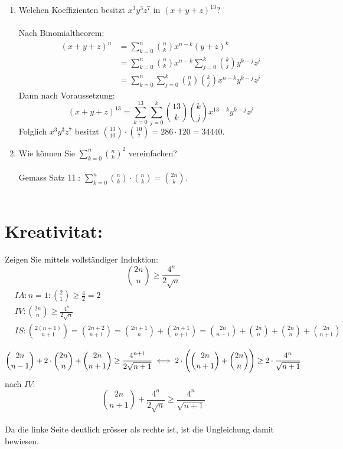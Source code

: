 \begin{enumerate}[label=(\alph*)]
        \item Welchen Koeffizienten besitzt $x^3y^3z^7$ in $(x+y+z)^{13}$?\\\\
        Nach Binomialtheorem:
        \begin{align*}
        (x+y+z)^{n} &= \sum_{k=0}^{n} \binom{n}{k}x^{n-k}(y+z)^k \\
        &= \sum_{k=0}^{n} \binom{n}{k}x^{n-k}\sum_{j=0}^{k}\binom{k}{j}y^{k-j}z^j \\
        &= \sum_{k=0}^{n}\sum_{j=0}^{k} \binom{n}{k}\binom{k}{j}x^{n-k}y^{k-j}z^j
        \end{align*}
        Dann nach Voraussetzung: 
        \[(x+y+z)^{13} = \sum_{k=0}^{13}\sum_{j=0}^{k} \binom{13}{k}\binom{k}{j}x^{13-k}y^{k-j}z^j\]
        Folglich $x^3y^3z^7$ besitzt $\binom{13}{10}\cdot\binom{10}{7} = 286 \cdot 120 = 34440$.

        \item Wie können Sie $\sum_{k=0}^n \binom{n}{k}^2$ vereinfachen?\\\\
        Gemass Satz 11.: $\sum_{k=0}^n \binom{n}{k}\cdot\binom{n}{k} = \binom{2n}{k}$.\\\\
    \end{enumerate}
    
    \section*{Kreativitat:} 
    Zeigen Sie mittels vollständiger Induktion:
    \[\binom{2n}{n}\geq \frac{4^n}{2\sqrt n}\]
    \begin{align*}
        &IA: n=1: \binom{2}{1}\geq \frac{4}{2} = 2\\ %
        &IV: \binom{2n}{n}\geq \frac{4^n}{2\sqrt n}\\
        &IS: \binom{2(n+1)}{n+1}=\binom{2n+2}{n+1}
        = \binom{2n+1}{n} + \binom{2n+1}{n+1}
        = \binom{2n}{n-1} + \binom{2n}{n} + \binom{2n}{n} + \binom{2n}{n+1}\\
    \end{align*}
    \[\binom{2n}{n-1} + 2\cdot\binom{2n}{n} + \binom{2n}{n+1} \geq \frac{4^{n+1}}{2\sqrt {n+1}}\\
    \iff 2\cdot\Bigg(\binom{2n}{n+1} + \binom{2n}{n}\Bigg) \geq 2\cdot\frac{4^n}{\sqrt {n+1}}\\\]
    nach $IV$: \[ \binom{2n}{n+1} + \frac{4^n}{2\sqrt{n}} \geq \frac{4^n}{\sqrt {n+1}} \]\\
    Da die linke Seite deutlich grösser als rechte ist, ist die Ungleichung damit bewiesen.
    
